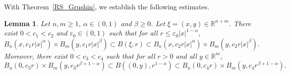 \documentclass[12pt]{amsart}
\newtheorem{lemma}[theorem]{Lemma}
\begin{document}
With Theorem~\ref{RS_Grushin}, we establish the following estimates.


\begin{lemma}\label{le_volume}
Let $n,m\ge 1$, $\alpha\in (0,1)$ and $\beta\ge 0$. Let $\xi=(x,y)\in \mathbb{R}^{n+m}$. There exist $0<c_1<c_2$ and $\varepsilon_0 \in (0,1)$ such that for all $r\le \varepsilon_0 |x|^{1-\alpha}$,
\begin{equation}\label{le_volume2}
B_n(x, c_1 r |x|^\alpha) \times B_m(y, c_1 r |x|^\beta) \subset B(\xi, r) \subset B_n(x, c_2 r |x|^\alpha) \times B_m(y, c_2 r |x|^\beta).
\end{equation}
Moreover, there exist $0<c_3<c_4$ such that for all $r>0$ and all $y\in \mathbb{R}^m$,
\begin{equation}\label{le_volume3}
B_n(0, c_3 r) \times B_m(y, c_3 r^{\beta+1-\alpha}) \subset B((0,y), r^{1-\alpha}) \subset B_n(0, c_4 r) \times B_m(y, c_4 r^{\beta+1-\alpha}).
\end{equation}
\end{lemma}
\end{document}
